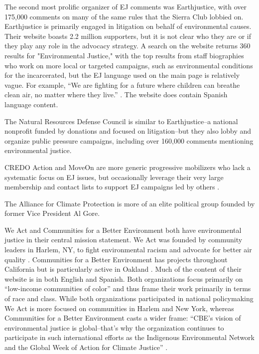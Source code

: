 \documentclass[
      12pt,
        ]{article}
\begin{document}
The second most prolific organizer of EJ comments was Earthjustice, with over 175,000 comments on many of the same rules that the Sierra Club lobbied on. Earthjustice is primarily engaged in litigation on
behalf of environmental causes. Their website boasts 2.2 million
supporters, but it is not clear who they are or if they play any role in
the advocacy strategy. A search on the website returns 360 results for
"Environmental Justice," with the top results from staff biographies
who work on more local or targeted campaigns, such as environmental conditions
for the incarcerated, but the EJ language used on the
main page is relatively vague. For example, ``We are fighting for a future
where children can breathe clean air, no matter where they live.''
\citep{Earthjustice2017}. The website does contain Spanish language content.

The Natural Resources Defense Council is similar to Earthjustice--a
national nonprofit funded by donations and focused on litigation--but
they also lobby and organize public pressure campaigns, including over 160,000 comments mentioning environmental justice.

CREDO Action and MoveOn are more generic progressive
mobilizers who lack a systematic focus on EJ issues,
but occasionally leverage their very large membership and contact lists to support
EJ campaigns led by others
\citep{MoveOn.org2017, CREDO2017}.

The Alliance for Climate Protection is more of an elite political group founded by former Vice President Al Gore.

We Act and Communities for a Better Environment both have environmental
justice in their central mission statement. We Act was founded by
community leaders in Harlem, NY, to fight environmental racism and
advocate for better air quality \citep{WEACT2017}. Communities for a Better Environment has projects throughout California but is particularly
active in Oakland \citep{CBECAL2017}. Much of the
content of their website is in both English and Spanish. Both
organizations focus primarily on ``low-income communities of color'' and
thus frame their work primarily in terms of race and class. While both
organizations participated in national policymaking We Act is more
focused on communities in Harlem and New York, whereas Communities for a
Better Environment casts a wider frame: ``CBE's vision of environmental
justice is global--that's why the organization continues to participate
in such international efforts as the Indigenous Environmental Network
and the Global Week of Action for Climate Justice'' \citep{CBECAL2017}.
\end{document}
